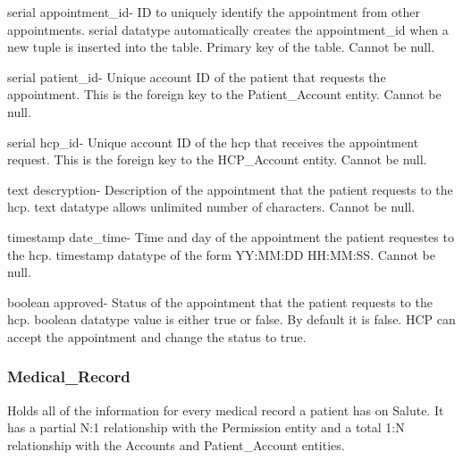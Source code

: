 \documentclass[12pt]{report}
\begin{document}
\begin{description}
\item serial appointment\_id- ID to uniquely identify the appointment from other appointments. serial datatype automatically creates the appointment\_id when a new tuple is inserted into the table.  Primary key of the table.  Cannot be null.
\item serial patient\_id-  Unique account ID of the patient that requests the appointment.  This is the foreign key to the Patient\_Account entity.  Cannot be null.
\item serial hcp\_id- Unique account ID of the hcp that receives the appointment request.  This is the foreign key to the HCP\_Account entity.  Cannot be null.
\item text descryption- Description of the appointment that the patient requests to the hcp.  text datatype allows unlimited number of characters.  Cannot be null.
\item timestamp date\_time- Time and day of the appointment the patient requestes to the hcp.  timestamp datatype of the form YY:MM:DD HH:MM:SS.  Cannot be null.
\item boolean approved- Status of the appointment that the patient requests to the hcp.  boolean datatype value is either true or false.  By default it is false.  HCP can accept the appointment and change the status to true.
\end{description}

\subsubsection{Medical\_Record}
Holds all of the information for every medical record a patient has on Salute.  It has a partial N:1 relationship with the Permission entity and a total 1:N relationship with the Accounts and Patient\_Account entities.
\end{document}
